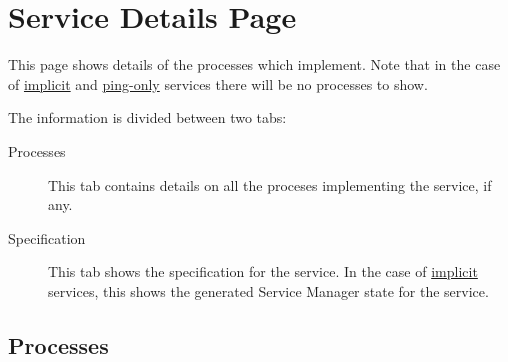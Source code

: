 % 
% 
% 
% 
\section{Service Details Page}
\label{sec:ws-service-details}

This page shows details of the processes which implement.  Note that in the case of
\hyperref[sec:services.implicit]{implicit} and \hyperref[subsub:services.ping-only]{ping-only}
services there will be no processes to show.

The information is divided between two tabs:

   \begin{description}
       \item[Processes] This tab contains details on all the proceses implementing
         the service, if any.
       \item[Specification] This tab shows the specification for the service.  In the
         case of \hyperref[sec:services.implicit]{implicit} services, this shows the generated Service Manager
         state for the service.
   \end{description}  

   \subsection{Processes}
   \label{sec:ws-services-processes}

